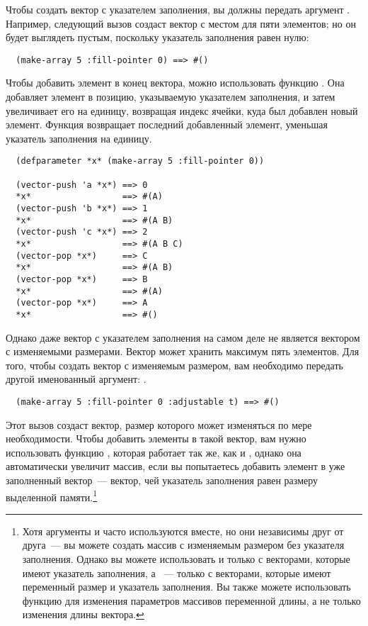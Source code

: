 Чтобы создать вектор с указателем заполнения, вы должны передать 
аргумент .  Например, следующий вызов  создаст вектор
с местом для пяти элементов; но он будет выглядеть пустым, поскольку указатель заполнения
равен нулю:

\begin{verbatim}
  (make-array 5 :fill-pointer 0) ==> #()
\end{verbatim}

Чтобы добавить элемент в конец вектора, можно использовать функцию
.  Она добавляет элемент в позицию, указываемую указателем заполнения, и
затем увеличивает его на единицу, возвращая индекс ячейки, куда был добавлен новый
элемент.  Функция  возвращает последний добавленный элемент, уменьшая
указатель заполнения на единицу.

\begin{verbatim}
  (defparameter *x* (make-array 5 :fill-pointer 0))
  
  (vector-push 'a *x*) ==> 0
  *x*                  ==> #(A)
  (vector-push 'b *x*) ==> 1
  *x*                  ==> #(A B)
  (vector-push 'c *x*) ==> 2
  *x*                  ==> #(A B C)
  (vector-pop *x*)     ==> C
  *x*                  ==> #(A B)
  (vector-pop *x*)     ==> B
  *x*                  ==> #(A)
  (vector-pop *x*)     ==> A
  *x*                  ==> #()
\end{verbatim}

Однако даже вектор с указателем заполнения на самом деле не является вектором с изменяемыми
размерами.  Вектор  может хранить максимум пять элементов.  Для того, чтобы
создать вектор с изменяемым размером, вам необходимо передать  другой
именованный аргумент: .

\begin{verbatim}
  (make-array 5 :fill-pointer 0 :adjustable t) ==> #()
\end{verbatim}

Этот вызов создаст вектор, размер которого может изменяться по мере необходимости.  Чтобы
добавить элементы в такой вектор, вам нужно использовать функцию
, которая работает так же, как и , однако
она автоматически увеличит массив, если вы попытаетесь добавить элемент в
уже заполненный вектор~--- вектор, чей указатель заполнения равен размеру выделенной
памяти.\footnote{Хотя аргументы  и  часто используются
  вместе, но они независимы друг от друга~--- вы можете создать
  массив с изменяемым размером без указателя заполнения.  Однако вы можете использовать
   и  только с векторами, которые имеют указатель
  заполнения, а ~--- только с векторами, которые имеют переменный
  размер и указатель заполнения.  Вы также можете использовать функцию 
  для изменения параметров массивов переменной длины, а не только изменения длины
  вектора.}


